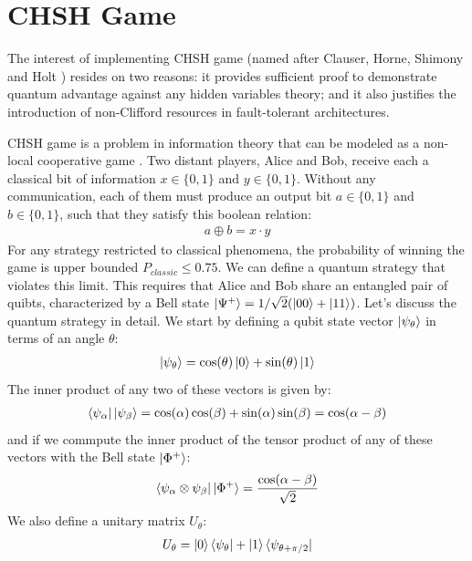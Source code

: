 \documentclass[12pt, twoside, openany]{book}
\begin{document}
\section{CHSH Game}

The interest of implementing CHSH game (named after Clauser, Horne, Shimony and Holt \cite{CHSH}) resides on two reasons: it provides sufficient proof to demonstrate quantum advantage against any hidden variables theory; and it also justifies the introduction of non-Clifford resources in fault-tolerant architectures.

CHSH game is a problem in information theory that can be modeled as a non-local cooperative game \cite{watrous2025understandingquantuminformationcomputation}. Two distant players, Alice and Bob, receive each a classical bit of information $x \in \{ 0,1 \}$ and $y \in \{ 0,1 \}$. Without any communication, each of them must produce an output bit $a \in \{ 0,1 \}$ and $b \in \{ 0,1 \}$, such that they satisfy this boolean relation:
\begin{align*}
    a \oplus b = x \cdot y
\end{align*}
For any strategy restricted to classical phenomena, the probability of winning the game is upper bounded $P_{classic} \leq 0.75$. We can define a quantum strategy that violates this limit. This requires that Alice and Bob share an entangled pair of quibts, characterized by a Bell state $\ket{\Psi ^+} = 1/\sqrt{2}(\ket{00} + \ket{11})$. Let's discuss the quantum strategy in detail. We start by defining a qubit state vector $\ket{\psi_{\theta}}$ in terms of an angle $\theta$:
\begin{align*}
    \ket{\psi_{\theta}} = \cos(\theta) \ket{0} + \sin(\theta) \ket{1}
\end{align*}
The inner product of any two of these vectors is given by:
\begin{align*}
    \bra{\psi_{\alpha}} \ket{\psi_{\beta}} = \cos(\alpha) \cos(\beta) + \sin(\alpha) \sin(\beta) = \cos(\alpha - \beta)
\end{align*}
and if we commpute the inner product of the tensor product of any of these vectors with the Bell state $\ket{\Phi^+}$:
\begin{align} \label{inner_product_CHSH}
    \bra{\psi_{\alpha} \otimes \psi_{\beta}} \ket{\Phi^+} = \frac{\cos(\alpha - \beta)}{\sqrt{2}}
\end{align}
We also define a unitary matrix $U_\theta$:
\begin{align*}
    U_\theta = \ket{0} \bra{\psi_\theta} + \ket{1} \bra{\psi_{\theta+\pi/2}}
\end{align*}
\end{document}
